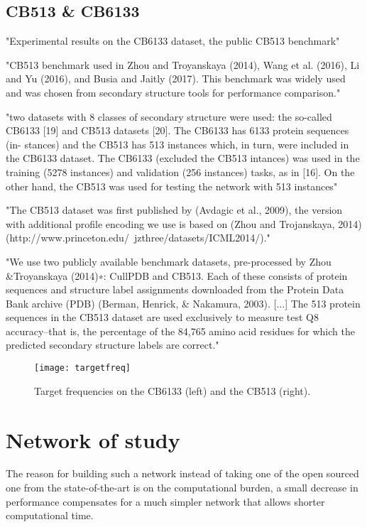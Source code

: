 \subsection{CB513 \& CB6133}
"Experimental results on the CB6133 dataset, the public CB513 benchmark" \cite{Li2016}

"CB513 benchmark used in Zhou and Troyanskaya (2014), Wang et al. (2016), Li and Yu (2016), and Busia and Jaitly (2017). This benchmark was widely used and was chosen from secondary structure tools for performance comparison." \cite{Fang2017}

"two datasets with 8 classes of secondary structure were used: the so-called CB6133 [19] and CB513 datasets [20]. The CB6133 has 6133 protein sequences (in- stances) and the CB513 has 513 instances which, in turn, were included in the CB6133 dataset. The CB6133 (excluded the CB513 intances) was used in the training (5278 instances) and validation (256 instances) tasks, as in [16]. On the other hand, the CB513 was used for testing the network with 513 instances" \cite{Hattori2017}

"The CB513 dataset was first published by (Avdagic et al., 2009), the version with additional profile encoding we use is based on (Zhou and  Trojanskaya, 2014) (http://www.princeton.edu/~jzthree/datasets/ICML2014/)." \cite{Jurtz2017}

"We use two publicly available benchmark datasets, pre-processed by Zhou \&Troyanskaya (2014)∗: CullPDB and CB513. Each of these consists of protein sequences and structure label assignments downloaded from the Protein Data Bank archive (PDB) (Berman, Henrick, \& Nakamura, 2003). [...] The 513 protein sequences in the CB513 dataset are used exclusively to measure test Q8 accuracy–that is, the percentage of the 84,765 amino acid residues for which the predicted secondary structure labels are correct." \cite{Busia2017}

\begin{figure}[h]
	\centering
	\texttt{[image: targetfreq]}
	\caption{Target frequencies on the CB6133 (left) and the CB513 (right).}
	\label{fig:targetfreq}
\end{figure}


\section{Network of study}\label{sect:network}

The reason for building such a network instead of taking one of the open sourced one from the state-of-the-art is on the computational burden, a small decrease in performance compensates for a much simpler network that allows shorter computational time.


